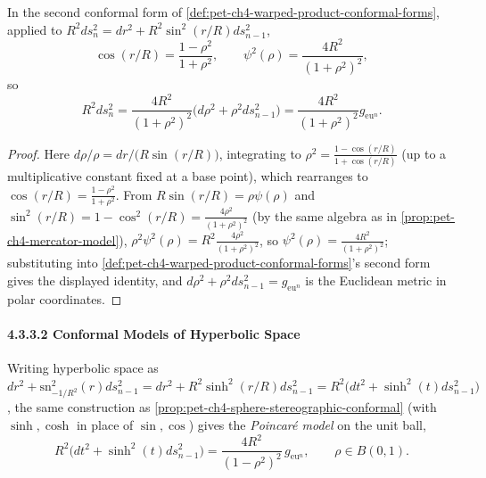 \begin{proposition}
  \label{prop:pet-ch4-sphere-stereographic-conformal}
  In the second conformal form of
  \cref{def:pet-ch4-warped-product-conformal-forms}, applied to
  $R^2ds_n^2=dr^2+R^2\sin^2(r/R)ds_{n-1}^2$,
  \[
    \cos(r/R)=\frac{1-\rho^2}{1+\rho^2},\qquad
    \psi^2(\rho)=\frac{4R^2}{(1+\rho^2)^2},
  \]
  so
  \[
    R^2ds_n^2=\frac{4R^2}{(1+\rho^2)^2}\big(d\rho^2+\rho^2ds_{n-1}^2\big)
    =\frac{4R^2}{(1+\rho^2)^2}g_{\mathrm{eu}^n}.
  \]
\end{proposition}
\begin{proof}
  Here $d\rho/\rho=dr/\big(R\sin(r/R)\big)$, integrating to
  $\rho^2=\tfrac{1-\cos(r/R)}{1+\cos(r/R)}$ (up to a multiplicative constant
  fixed at a base point), which rearranges to
  $\cos(r/R)=\tfrac{1-\rho^2}{1+\rho^2}$. From $R\sin(r/R)=\rho\psi(\rho)$ and
  $\sin^2(r/R)=1-\cos^2(r/R)=\tfrac{4\rho^2}{(1+\rho^2)^2}$ (by the same
  algebra as in \cref{prop:pet-ch4-mercator-model}),
  $\rho^2\psi^2(\rho)=R^2\tfrac{4\rho^2}{(1+\rho^2)^2}$, so
  $\psi^2(\rho)=\tfrac{4R^2}{(1+\rho^2)^2}$; substituting into
  \cref{def:pet-ch4-warped-product-conformal-forms}'s second form gives the
  displayed identity, and $d\rho^2+\rho^2ds_{n-1}^2=g_{\mathrm{eu}^n}$ is the
  Euclidean metric in polar coordinates.
\end{proof}

\paragraph{4.3.3.2 Conformal Models of Hyperbolic Space}

\begin{proposition}
  \label{prop:pet-ch4-poincare-disc-model}
  Writing hyperbolic space as
  $dr^2+\mathrm{sn}_{-1/R^2}^2(r)ds_{n-1}^2=dr^2+R^2\sinh^2(r/R)ds_{n-1}^2
  =R^2\big(dt^2+\sinh^2(t)ds_{n-1}^2\big)$, the same construction as
  \cref{prop:pet-ch4-sphere-stereographic-conformal} (with $\sinh,\cosh$ in
  place of $\sin,\cos$) gives the \emph{Poincaré model} on the unit ball,
  \[
    R^2\big(dt^2+\sinh^2(t)ds_{n-1}^2\big)=\frac{4R^2}{(1-\rho^2)^2}\,g_{\mathrm{eu}^n},
    \qquad\rho\in B(0,1).
  \]
\end{proposition}

